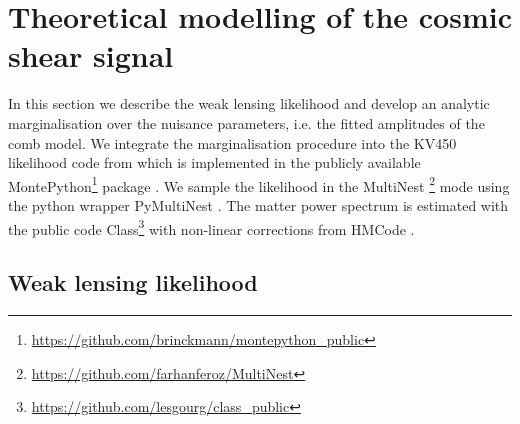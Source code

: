 \documentclass{aa}
\begin{document}


\section{Theoretical modelling of the cosmic shear signal}
\label{sec:likelihood}
In this section we describe the weak lensing likelihood and develop an analytic marginalisation over the nuisance parameters, i.e. the fitted amplitudes of the comb model.
We integrate the marginalisation procedure into the KV450 likelihood code from \cite{hildebrandt18} which is implemented in the publicly available {\sc MontePython}\footnote{\url{https://github.com/brinckmann/montepython_public}} package \citep{Audren:2012wb, Brinckmann:2018cvx}. We sample the likelihood in the {\sc MultiNest} \footnote{\url{https://github.com/farhanferoz/MultiNest}} mode \citep{feroz09,feroz19} using the python wrapper {\sc PyMultiNest} \citep{buchner14}. The matter power spectrum is estimated with the public code {\sc Class}\footnote{\url{https://github.com/lesgourg/class_public}}\citep{blas11} with non-linear corrections from {\sc HMCode} \citep{mead15}.
\subsection{Weak lensing likelihood}
\end{document}
